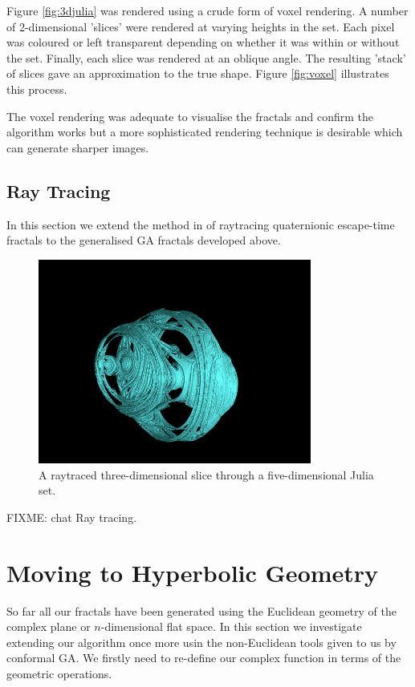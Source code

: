 Figure \ref{fig:3djulia} was rendered using a crude form of voxel rendering. A
number of 2-dimensional 'slices' were rendered at varying heights in the set. Each
pixel was coloured or left transparent depending on whether it was within or without
the set. Finally, each slice was rendered at an oblique angle. The resulting
'stack' of slices gave an approximation to the true shape. Figure
\ref{fig:voxel} illustrates this process.

The voxel rendering was adequate to visualise the fractals and confirm the algorithm
works but a more sophisticated rendering technique is desirable which can generate
sharper images.

\subsection{Ray Tracing}

In this section we extend the method in \cite{FRAC:HypercomplexIterations} of 
raytracing quaternionic escape-time fractals to the generalised GA fractals developed 
above.


\begin{figure}
\centering
\includegraphics[width=0.8\textwidth]{5djulia}
\caption{\label{fig:5djulia}
  A raytraced three-dimensional slice through a five-dimensional Julia set.
}
\end{figure}

FIXME: chat Ray tracing.

\section{Moving to Hyperbolic Geometry}

So far all our fractals have been generated using the Euclidean geometry of the complex plane
or $n$-dimensional flat space. In this section we investigate extending our algorithm once
more usin the non-Euclidean tools given to us by conformal GA. We firstly need to re-define 
our complex function in terms of the geometric operations.

